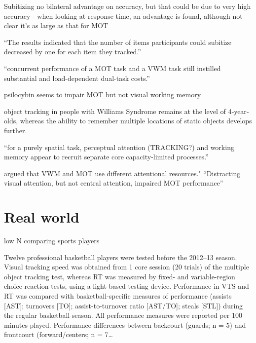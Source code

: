 \documentclass[]{book}
\begin{document}
Subitizing no bilateral advantage on accuracy, but that could be due to very high accuracy - when looking at response time, an advantage is found, although not clear it's as large as that for MOT \citet{railoBilateralTwoitemAdvantage2014}

``The results indicated that the number of items participants could subitize decreased by one for each item they tracked.'' \citet{chesneyEvidenceSharedMechanism2011}

``concurrent performance of a MOT task and a VWM task still instilled substantial and load-dependent dual-task costs.'' \citet{fougnieDistinctCapacityLimits2006}

\citet{allenMultipletargetTrackingRole2006}

psilocybin seems to impair MOT but not visual working memory \citep{carterUsingPsilocybinInvestigate2005}

object tracking in people with Williams Syndrome remains at the level of 4‐year‐olds, whereas the ability to remember multiple locations of static objects develops further. \citet{ohearnDevelopmentalProfilesMultiple2010}

\citet{howardVisualSpatialAttention2020} ``for a purely spatial task, perceptual attention (TRACKING?) and working memory appear to recruit separate core capacity-limited processes.''

\citet{souzaContributionsVisualCentral2017} argued that VWM and MOT use different attentional resources." ``Distracting visual attention, but not central attention, impaired MOT performance''

\hypertarget{real-world}{%
\chapter{Real world}\label{real-world}}

\citet{harrisExaminingRolesWorking2020} low N comparing sports players

\citet{mangineVisualTrackingSpeed2014} Twelve professional basketball players were tested before the 2012--13 season. Visual tracking speed was obtained from 1 core session (20 trials) of the multiple object tracking test, whereas RT was measured by fixed- and variable-region choice reaction tests, using a light-based testing device. Performance in VTS and RT was compared with basketball-specific measures of performance (assists {[}AST{]}; turnovers {[}TO{]}; assist-to-turnover ratio {[}AST/TO{]}; steals {[}STL{]}) during the regular basketball season. All performance measures were reported per 100 minutes played. Performance differences between backcourt (guards; n = 5) and frontcourt (forward/centers; n = 7\ldots{}
\end{document}
